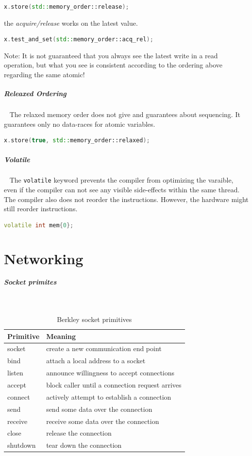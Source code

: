 \documentclass[11pt,twoside,landscape]{article}
\begin{document}
\begin{multicols}{2}
\begin{lstlisting}[language=c++,numbers=none]
x.store(std::memory_order::release);
\end{lstlisting}

the \emph{acquire/release} works on the latest value.
\begin{lstlisting}[language=c++,numbers=none]
x.test_and_set(std::memory_order::acq_rel);
\end{lstlisting}

Note: It is not guaranteed that you always see the latest write in a read operation, but what you see is consistent according to the ordering above regarding the same atomic!

\subparagraph{Releaxed Ordering} \
\label{sec:org8ec7208}
The relaxed memory order does not give and guarantees about sequencing.
It guarantees only no data-races for atomic variables.

\begin{lstlisting}[language=c++,numbers=none]
x.store(true, std::memory_order::relaxed);
\end{lstlisting}

\subparagraph{Volatile} \
\label{sec:orgbeaf3dd}
The \texttt{volatile} keyword prevents the compiler from optimizing the varaible, even if the compiler can not see any visible side-effects within the same thread.
The compiler also does not reorder the instructions.
However, the hardware might still reorder instructions.

\begin{lstlisting}[language=c++,numbers=none]
volatile int mem{0};
\end{lstlisting}

\section{Networking}
\label{sec:org1b91071}
\subparagraph{Socket primites} \
\label{sec:orgbb4a34b}
\begin{table}[htbp]
\caption{\label{tbl:berkley-socket-primitives}Berkley socket primitives}
\centering
\begin{tabular}{ll}
Primitive & Meaning\\[0pt]
\hline
socket & create a new communication end point\\[0pt]
bind & attach a local address to a socket\\[0pt]
listen & announce willingness to accept connections\\[0pt]
accept & block caller until a connection request arrives\\[0pt]
connect & actively attempt to establish a connection\\[0pt]
send & send some data over the connection\\[0pt]
receive & receive some data over the connection\\[0pt]
close & release the connection\\[0pt]
shutdown & tear down the connection\\[0pt]
\end{tabular}
\end{table}


\end{multicols}
\end{document}
